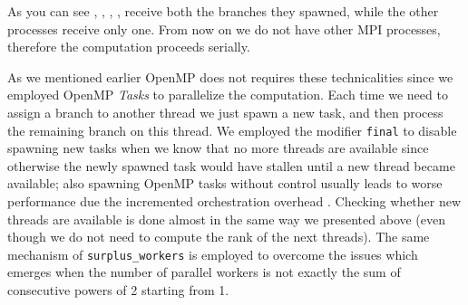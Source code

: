 \documentclass{article}
\begin{document}
\begin{figure}[H]
    \centering
\end{figure}

As you can see , , , ,  receive both the
branches they spawned, while the other processes receive only one. From now on
we do not have other MPI processes, therefore the computation proceeds serially.

As we mentioned earlier OpenMP does not requires these technicalities since we
employed OpenMP \emph{Tasks} to parallelize the computation. Each time we need
to assign a branch to another thread we just spawn a new task, and then process
the remaining branch on this thread. We employed the modifier \texttt{final}
to disable spawning new tasks when we know that no more threads are available
since otherwise the newly spawned task would have stallen until a new thread
became available; also spawning OpenMP tasks without control usually leads to
worse performance due the incremented orchestration overhead
\cite{hager2010introduction}. Checking whether new threads are available is done
almost in the same way we presented above (even though we do not need to compute
the rank of the next threads). The same mechanism of \texttt{surplus\_workers}
is employed to overcome the issues which emerges when the number of parallel
workers is not exactly the sum of consecutive powers of 2 starting from 1.
\end{document}
